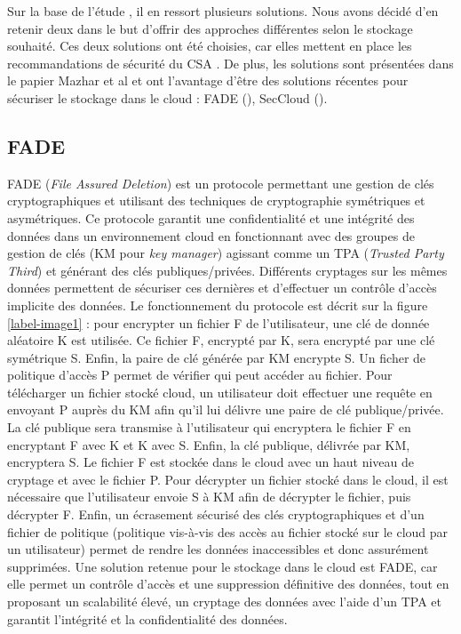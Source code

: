 Sur la base de l'étude \cite{security_cloud_survey}, il en ressort plusieurs solutions. Nous avons décidé d'en retenir deux dans le but d'offrir des approches différentes selon le stockage souhaité. Ces deux solutions ont été choisies, car elles mettent en place les recommandations de sécurité du CSA \cite{security_guidelines}. De plus, les solutions sont présentées dans le papier Mazhar et al \cite{security_cloud_survey} et ont l'avantage d'être des solutions récentes pour sécuriser le stockage dans le cloud : FADE (\cite{fade}), SecCloud (\cite{secCloud}).

\subsection{FADE}

FADE (\textit{File Assured Deletion}) est un protocole permettant une gestion de clés cryptographiques et utilisant des techniques de cryptographie symétriques et asymétriques. Ce protocole garantit une confidentialité et une intégrité des données dans un environnement cloud en fonctionnant avec des groupes de gestion de clés (KM pour \textit{key manager}) agissant comme un \gls{TPA} (\textit{Trusted Party Third}) et générant des clés publiques/privées.
Différents cryptages sur les mêmes données permettent de sécuriser ces dernières et d'effectuer un contrôle d'accès implicite des données. Le fonctionnement du protocole est décrit sur la figure \ref{label-image1} : pour encrypter un fichier F de l'utilisateur, une clé de donnée aléatoire K est utilisée. Ce fichier F, encrypté par K, sera encrypté par une clé symétrique S. Enfin, la paire de clé générée par KM encrypte S. Un ficher de politique d'accès P permet de vérifier qui peut accéder au fichier. 
\newline
Pour télécharger un fichier stocké cloud, un utilisateur doit effectuer une requête en envoyant P auprès du KM afin qu'il lui délivre une paire de clé publique/privée. La clé publique sera transmise à l'utilisateur qui encryptera le fichier F en encryptant F avec K et K avec S. Enfin, la clé publique, délivrée par KM, encryptera S. Le fichier F est stockée dans le cloud avec un haut niveau de cryptage et avec le fichier P. Pour décrypter un fichier stocké dans le cloud, il est nécessaire que l'utilisateur envoie S à KM afin de décrypter le fichier, puis décrypter F. 
\newline
Enfin, un écrasement sécurisé des clés cryptographiques et d'un fichier de politique (politique vis-à-vis des accès au fichier stocké sur le cloud par un utilisateur) permet de rendre les données inaccessibles et donc assurément supprimées.
\newline 
Une solution retenue pour le stockage dans le cloud est FADE, car elle permet un contrôle d'accès et une suppression définitive des données, tout en proposant un scalabilité élevé, un cryptage des données avec l'aide d'un TPA et garantit l'intégrité et la confidentialité des données.

